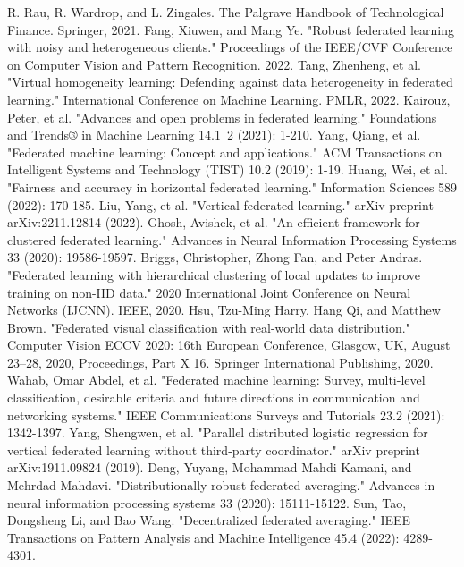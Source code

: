 \documentclass[conference]{IEEEtran}
\begin{document}
\begin{thebibliography}{00}
     R. Rau, R. Wardrop, and L. Zingales. The Palgrave Handbook of Technological Finance. Springer, 2021.
     Fang, Xiuwen, and Mang Ye. "Robust federated learning with noisy and heterogeneous clients." Proceedings of the IEEE/CVF Conference on Computer Vision and Pattern Recognition. 2022.
     Tang, Zhenheng, et al. "Virtual homogeneity learning: Defending against data heterogeneity in federated learning." International Conference on Machine Learning. PMLR, 2022.
     Kairouz, Peter, et al. "Advances and open problems in federated learning." Foundations and Trends® in Machine Learning 14.1~2 (2021): 1-210.
     Yang, Qiang, et al. "Federated machine learning: Concept and applications." ACM Transactions on Intelligent Systems and Technology (TIST) 10.2 (2019): 1-19.
     Huang, Wei, et al. "Fairness and accuracy in horizontal federated learning." Information Sciences 589 (2022): 170-185.
     Liu, Yang, et al. "Vertical federated learning." arXiv preprint arXiv:2211.12814 (2022).
     Ghosh, Avishek, et al. "An efficient framework for clustered federated learning." Advances in Neural Information Processing Systems 33 (2020): 19586-19597.
     Briggs, Christopher, Zhong Fan, and Peter Andras. "Federated learning with hierarchical clustering of local updates to improve training on non-IID data." 2020 International Joint Conference on Neural Networks (IJCNN). IEEE, 2020.
     Hsu, Tzu-Ming Harry, Hang Qi, and Matthew Brown. "Federated visual classification with real-world data distribution." Computer Vision ECCV 2020: 16th European Conference, Glasgow, UK, August 23–28, 2020, Proceedings, Part X 16. Springer International Publishing, 2020.
     Wahab, Omar Abdel, et al. "Federated machine learning: Survey, multi-level classification, desirable criteria and future directions in communication and networking systems." IEEE Communications Surveys and Tutorials 23.2 (2021): 1342-1397.
     Yang, Shengwen, et al. "Parallel distributed logistic regression for vertical federated learning without third-party coordinator." arXiv preprint arXiv:1911.09824 (2019).
     Deng, Yuyang, Mohammad Mahdi Kamani, and Mehrdad Mahdavi. "Distributionally robust federated averaging." Advances in neural information processing systems 33 (2020): 15111-15122.
     Sun, Tao, Dongsheng Li, and Bao Wang. "Decentralized federated averaging." IEEE Transactions on Pattern Analysis and Machine Intelligence 45.4 (2022): 4289-4301.

\end{thebibliography}
\end{document}
